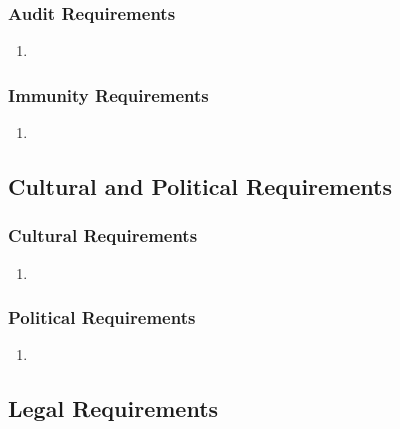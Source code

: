 \documentclass[]{article}
\begin{document}
\subsubsection{Audit Requirements}
\label{ssub:audit_requirements}
\begin{enumerate}[{SR}1. ]
	\item 
\end{enumerate}

\subsubsection{Immunity Requirements}
\label{ssub:immunity_requirements}
\begin{enumerate}[{SR}1. ]
	\item 
\end{enumerate}


\subsection{Cultural and Political Requirements}
\label{sub:cultural_and_political_requirements}

\subsubsection{Cultural Requirements}
\label{ssub:cultural_requirements}
\begin{enumerate}[{CP}1. ]
	\item 
\end{enumerate}

\subsubsection{Political Requirements}
\label{ssub:political_requirements}
\begin{enumerate}[{CP}1. ]
	\item 
\end{enumerate}


\subsection{Legal Requirements}
\label{sub:legal_requirements}
\end{document}
